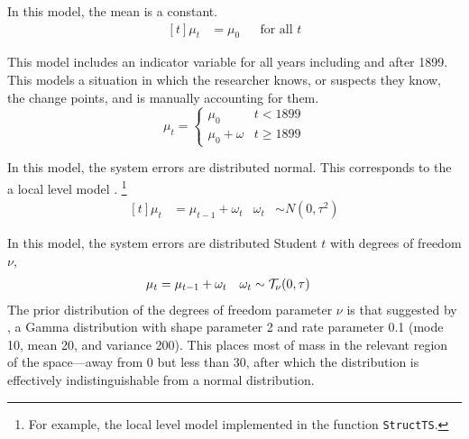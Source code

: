 \documentclass[12pt]{article}
\begin{document}
\begin{description}[font = \normalfont\ModelII]
\item[Constant] In this model, the mean is a constant.
  \begin{equation}
    \label{dlm:eq:21}
    \begin{aligned}[t]
      \mu_{t} &= \mu_{0} && \text{for all $t$}
    \end{aligned}
  \end{equation}
\item[Intervention] This model includes an indicator variable for all years including and after 1899.
  This models a situation in which the researcher knows, or suspects they know, the change points, and is manually accounting for them.
  \begin{equation}
    \mu_{t} =
    \begin{cases}
      \mu_{0} & t < 1899 \\
      \mu_{0} + \omega & t \geq 1899
    \end{cases}
  \end{equation}
\item[Normal] In this model, the system errors are distributed normal.
  This corresponds to the a local level model \parencites[Ch. 2]{DurbinKoopman2012}[Ch. 2]{WestHarrison1997}.%
  \footnote{For example, the local level model implemented in the \RLang{} function \texttt{StructTS}.}
  \begin{equation}
    \label{dlm:eq:11}
    \begin{aligned}[t]
      \mu_{t} &= \mu_{t - 1} + \omega_{t} & \omega_{t} & \sim N(0, \tau^{2})
    \end{aligned}
  \end{equation}
\item[StudentT] In this model, the system errors are distributed Student $t$ with degrees of freedom $\nu$,
  \begin{equation}
    \label{dlm:eq:18}
    \begin{aligned}[t]
      \mu_{t} &= \mu_{t - 1} + \omega_{t} & \omega_{t} & \sim \mathcal{T}_{\nu}\mathopen{}\left(0, \tau\right)\mathclose{}
    \end{aligned}
  \end{equation}
  The prior distribution of the degrees of freedom parameter $\nu$ is that suggested by \textcites{JuarezSteel2010b}, a Gamma distribution with shape parameter 2 and rate parameter 0.1 (mode 10, mean 20, and variance 200).
  This places most of mass in the relevant region of the space---away from 0 but less than 30, after which the distribution is effectively indistinguishable from a normal distribution.

\end{description}
\end{document}
